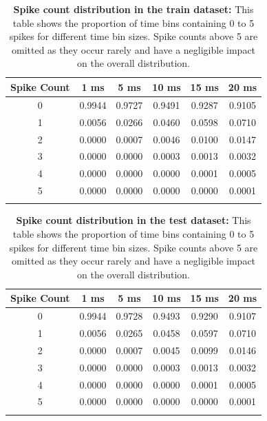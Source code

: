 \begin{table}
    \centering\footnotesize\sf
    \begin{tabular}{cccccc}
    \toprule
        Spike Count & 1 ms & 5 ms & 10 ms & 15 ms & 20 ms \\
        \midrule
        0 & 0.9944 & 0.9727 & 0.9491 & 0.9287 & 0.9105 \\
        1 & 0.0056 & 0.0266 & 0.0460 & 0.0598 & 0.0710 \\
        2 & 0.0000 & 0.0007 & 0.0046 & 0.0100 & 0.0147 \\
        3 & 0.0000 & 0.0000 & 0.0003 & 0.0013 & 0.0032 \\
        4 & 0.0000 & 0.0000 & 0.0000 & 0.0001 & 0.0005 \\
        5 & 0.0000 & 0.0000 & 0.0000 & 0.0000 & 0.0001 \\
    \addlinespace %
    \bottomrule
    \end{tabular}
    \caption{\textbf{Spike count distribution in the train dataset:} This table shows the proportion of time bins containing 0 to 5 spikes for different time bin sizes. Spike counts above 5 are omitted as they occur rarely and have a negligible impact on the overall distribution.}
    \label{tab:train_bin_count_distribution}
\end{table}
    

\begin{table}
    \centering\footnotesize\sf
    \begin{tabular}{cccccc}
    \toprule
        Spike Count & 1 ms & 5 ms & 10 ms & 15 ms & 20 ms \\
    \midrule
        0 & 0.9944 & 0.9728 & 0.9493 & 0.9290 & 0.9107 \\
        1 & 0.0056 & 0.0265 & 0.0458 & 0.0597 & 0.0710 \\
        2 & 0.0000 & 0.0007 & 0.0045 & 0.0099 & 0.0146 \\
        3 & 0.0000 & 0.0000 & 0.0003 & 0.0013 & 0.0032 \\
        4 & 0.0000 & 0.0000 & 0.0000 & 0.0001 & 0.0005 \\
        5 & 0.0000 & 0.0000 & 0.0000 & 0.0000 & 0.0001 \\
    \addlinespace %
    \bottomrule
    \end{tabular}
    \caption{\textbf{Spike count distribution in the test dataset:} This table shows the proportion of time bins containing 0 to 5 spikes for different time bin sizes. Spike counts above 5 are omitted as they occur rarely and have a negligible impact on the overall distribution.}
    \label{tab:test_bin_count_distribution}
\end{table}

